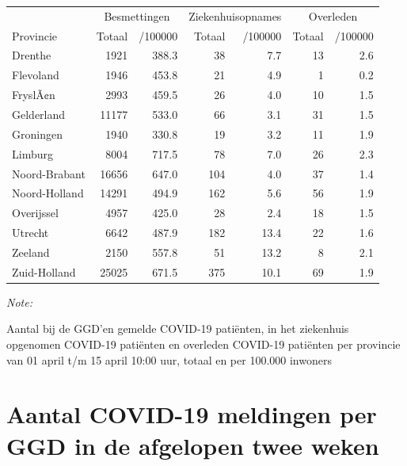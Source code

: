 \documentclass[
  english,
  man,floatsintext]{apa6}
\begin{document}
\begin{table}
\centering
\begin{threeparttable}
\begin{tabular}{lrrrrrr}
\toprule
\multicolumn{1}{c}{ } & \multicolumn{2}{c}{Besmettingen} & \multicolumn{2}{c}{Ziekenhuisopnames} & \multicolumn{2}{c}{Overleden} \\
\cmidrule(l{3pt}r{3pt}){2-3} \cmidrule(l{3pt}r{3pt}){4-5} \cmidrule(l{3pt}r{3pt}){6-7}
Provincie & Totaal & /100000 & Totaal & /100000 & Totaal & /100000\\
\midrule
Drenthe & 1921 & 388.3 & 38 & 7.7 & 13 & 2.6\\
Flevoland & 1946 & 453.8 & 21 & 4.9 & 1 & 0.2\\
FryslÃ¢n & 2993 & 459.5 & 26 & 4.0 & 10 & 1.5\\
Gelderland & 11177 & 533.0 & 66 & 3.1 & 31 & 1.5\\
Groningen & 1940 & 330.8 & 19 & 3.2 & 11 & 1.9\\
Limburg & 8004 & 717.5 & 78 & 7.0 & 26 & 2.3\\
Noord-Brabant & 16656 & 647.0 & 104 & 4.0 & 37 & 1.4\\
Noord-Holland & 14291 & 494.9 & 162 & 5.6 & 56 & 1.9\\
Overijssel & 4957 & 425.0 & 28 & 2.4 & 18 & 1.5\\
Utrecht & 6642 & 487.9 & 182 & 13.4 & 22 & 1.6\\
Zeeland & 2150 & 557.8 & 51 & 13.2 & 8 & 2.1\\
Zuid-Holland & 25025 & 671.5 & 375 & 10.1 & 69 & 1.9\\
\bottomrule
\end{tabular}
\begin{tablenotes}
\item \textit{Note: } 
\item Aantal bij de GGD’en gemelde COVID-19 patiënten, in het ziekenhuis opgenomen COVID-19 patiënten en overleden COVID-19 patiënten per provincie van 01 april t/m 15 april 10:00 uur, totaal en per 100.000 inwoners
\end{tablenotes}
\end{threeparttable}
\end{table}

\newpage

\hypertarget{aantal-covid-19-meldingen-per-ggd-in-de-afgelopen-twee-weken}{%
\section{Aantal COVID-19 meldingen per GGD in de afgelopen twee weken}\label{aantal-covid-19-meldingen-per-ggd-in-de-afgelopen-twee-weken}}
\end{document}
